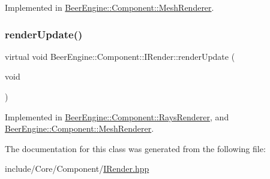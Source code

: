Implemented in \mbox{\hyperlink{class_beer_engine_1_1_component_1_1_mesh_renderer_ace87e6038f061bf1815f047f4bc0c6e8}{Beer\+Engine\+::\+Component\+::\+Mesh\+Renderer}}.

\mbox{\label{class_beer_engine_1_1_component_1_1_i_render_aef1ff4ddcdf216d290c747edd86bd99e}} 
\subsubsection{\texorpdfstring{render\+Update()}{renderUpdate()}}
{\footnotesize\ttfamily virtual void Beer\+Engine\+::\+Component\+::\+I\+Render\+::render\+Update (\begin{DoxyParamCaption}\item[{void}]{ }\end{DoxyParamCaption})\hspace{0.3cm}{\ttfamily [pure virtual]}}



Implemented in \mbox{\hyperlink{class_beer_engine_1_1_component_1_1_rays_renderer_a1647c9a5f40fc9186ccb6d55b7ebfe5e}{Beer\+Engine\+::\+Component\+::\+Rays\+Renderer}}, and \mbox{\hyperlink{class_beer_engine_1_1_component_1_1_mesh_renderer_abca4caa865363fdccb1b0c6fc6f7c81d}{Beer\+Engine\+::\+Component\+::\+Mesh\+Renderer}}.



The documentation for this class was generated from the following file\+:\begin{DoxyCompactItemize}
\item 
include/\+Core/\+Component/\mbox{\hyperlink{_i_render_8hpp}{I\+Render.\+hpp}}\end{DoxyCompactItemize}
